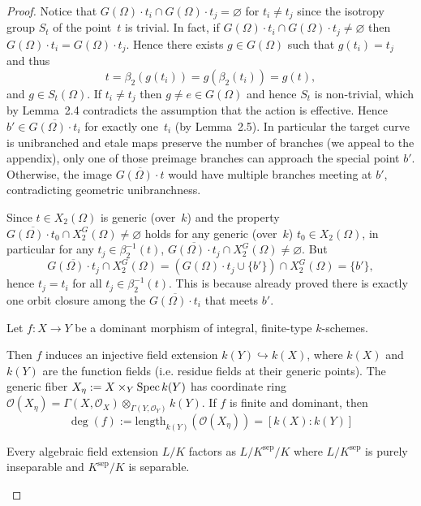 \documentclass[12pt]{article}
\begin{document}
\begin{proof}
Notice that $G(\Omega)\cdot t_i\cap G(\Omega)\cdot t_j=\varnothing$
for $t_i\neq t_j$ since the isotropy group $S_t$ of the point~$t$
is trivial.  In fact, if $G(\Omega)\cdot t_i\cap G(\Omega)\cdot t_j\neq\varnothing$
then $G(\Omega)\cdot t_i=G(\Omega)\cdot t_j$.
Hence there exists $g\in G(\Omega)$ such that $g(t_i)=t_j$
and thus
\[
   t = \beta_2(g(t_i)) = g(\beta_2(t_i)) = g(t) ,
\]
and $g\in S_t(\Omega)$.
If $t_i\neq t_j$ then $g\neq e\in G(\Omega)$ and hence
$S_t$ is non-trivial, which by Lemma~2.4 contradicts the assumption
that the action is effective.
Hence $b'\in \overline{G(\Omega)\cdot t_i}$ for exactly one~$t_i$ (by Lemma~2.5). In particular the target curve is unibranched and etale maps preserve the number of branches (we appeal to the appendix), only one of those preimage branches can approach the special point $b'$. Otherwise, the image $\overline{G(\Omega)\cdot t}$ would have multiple branches meeting at $b'$, contradicting geometric unibranchness.

Since $t\in X_2(\Omega)$ is generic (over~$k$) and the property
$\overline{G(\Omega)\cdot t_0}\cap X_2^G(\Omega)\neq\varnothing$
holds for any generic (over~$k$) $t_0\in X_2(\Omega)$,
in particular for any $t_j\in\beta_2^{-1}(t)$,
$\overline{G(\Omega)\cdot t_j}\cap X_2^G(\Omega)\neq\varnothing$.
But
\[
\overline{G(\Omega)\cdot t_j}\cap X_2^G(\Omega)
  = (G(\Omega)\cdot t_j\cup\{b'\})\cap X_2^G(\Omega)
  = \{b'\},
\]
hence $t_j=t_i$ for all $t_j\in\beta_2^{-1}(t)$. This is because already proved there is exactly one orbit closure among the $\overline{G(\Omega)\cdot t_i}$ that meets $b'$. 

\begin{remark}
    Let $f : X \to Y$ be a dominant morphism of integral, finite-type $k$-schemes.

   Then $f$ induces an injective field extension $k(Y) \hookrightarrow k(X)$, where $k(X)$ and $k(Y)$ are the function fields (i.e. residue fields at their generic points). The generic fiber $X_\eta := X \times_Y \operatorname{Spec} k(Y)$ has coordinate ring $\mathcal{O}(X_\eta) = \Gamma(X, \mathcal{O}_X) \otimes_{\Gamma(Y,\mathcal{O}_Y)} k(Y)$. If $f$ is finite and dominant, then \[\deg(f) := \text{length}_{k(Y)} (\mathcal{O}(X_\eta)) = [k(X) : k(Y)]\]

   Every algebraic field extension $L/K$ factors as $L/K^{\mathrm{sep}}/K$ where $L/K^{\mathrm{sep}}$ is purely inseparable and $K^{\mathrm{sep}}/K$ is separable.
   

\end{remark}
\end{proof}
\end{document}
